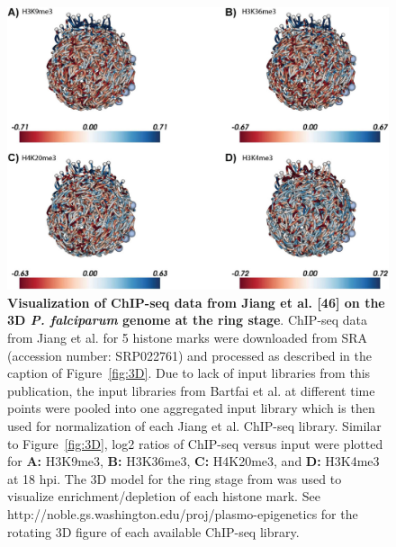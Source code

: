\begin{figure}
\begin{center}
\includegraphics[width=\linewidth]{figures/fig3.png}
\end{center}
\label{fig:fig3}
\caption{\textbf{Visualization of ChIP-seq data from Jiang et al. [46] on the
3D {\em P.
 falciparum} genome at the ring stage}.
 ChIP-seq data from Jiang et al. for 5 histone marks were downloaded from SRA
 (accession number: SRP022761) and processed as described in the caption of
 Figure~\ref{fig:3D}. Due to lack of input libraries from this publication, the input
 libraries from Bartfai et al. at different time points were pooled into one
 aggregated input library which is then used for normalization of each Jiang
 et al. ChIP-seq library. Similar to Figure~\ref{fig:3D}, log2 ratios of ChIP-seq versus
 input were plotted for \textbf{A:} H3K9me3, \textbf{B:} H3K36me3, \textbf{C:}
 H4K20me3, and \textbf{D:} H3K4me3
 at 18 hpi. The 3D model for the ring stage from \citep{ay:three-dimensional} was used to
 visualize enrichment/depletion of each histone mark. See
 http://noble.gs.washington.edu/proj/plasmo-epigenetics for the rotating 3D
 figure of each available ChIP-seq library.
}
\end{figure}


